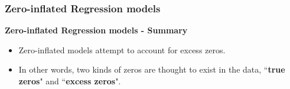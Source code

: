 \documentclass[MASTER.tex]{subfiles}
\begin{document}
	

\begin{frame}[fragile]
	\frametitle{Zero-inflated Regression models}
	\Large
	\vspace{-0.5cm}
	\textbf{Zero-inflated Regression models - Summary}
	\begin{itemize}
		\item Zero-inflated models attempt to account for excess zeros. 
		\item In other words, two kinds of zeros are thought to exist in the data, ``\textbf{true zeros}" and ``\textbf{excess zeros}". 
	\end{itemize}
\end{frame}
\end{document}
